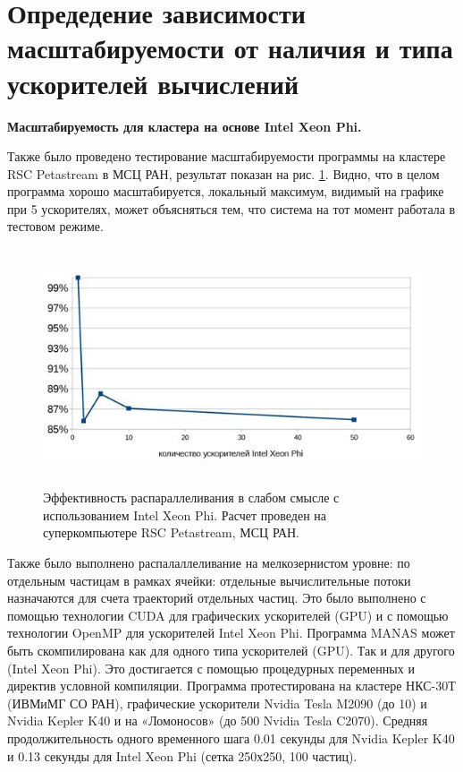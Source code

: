         
       
        
        \section{Опредедение зависимости масштабируемости от наличия и типа ускорителей вычислений}
        
        \textbf{Масштабируемость для кластера на основе Intel Xeon Phi.} 
        
       Также было проведено тестирование масштабируемости программы на кластере RSC Petastream в МСЦ РАН, результат показан на рис. \ref{phi100}. Видно, что в целом программа хорошо масштабируется, локальный максимум, видимый на графике при 5 ускорителях, может объясняться тем, что система на тот момент работала в тестовом режиме.
        
        \begin{figure}[htb]
        	\begin{center}
        		\includegraphics[height=7cm,keepaspectratio]{images/petastream_phi100.jpg}
        	\end{center}
        	\caption{Эффективность распараллеливания в слабом смысле с использованием Intel Xeon Phi. Расчет проведен на суперкомпьютере RSC Petastream, МСЦ РАН.}
        	\label{phi100}
        \end{figure}
        
        Также было выполнено распалаллеливание на мелкозернистом уровне: по отдельным частицам в рамках ячейки: отдельные вычислительные потоки назначаются для счета траекторий отдельных частиц. Это было выполнено с помощью технологии CUDA для графических ускорителей (GPU) и с помощью технологии OpenMP для ускорителей Intel Xeon Phi. Программа MANAS может быть скомпилирована как для одного типа ускорителей (GPU). Так и для другого (Intel Xeon Phi). Это достигается с помощью процедурных переменных и директив условной компиляции. Программа протестирована на кластере НКС-30Т (ИВМиМГ СО РАН), графические ускорители Nvidia Tesla M2090 (до 10) и Nvidia Kepler K40 и на «Ломоносов»  (до 500 Nvidia Tesla C2070). Средняя продолжительность одного временного шага 0.01 секунды для  Nvidia Kepler K40 и 0.13 секунды для  Intel Xeon Phi (сетка 250х250, 100 частиц).
        
